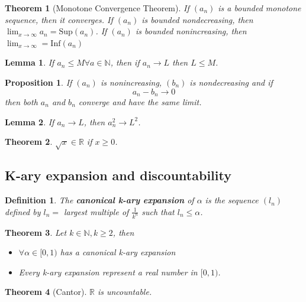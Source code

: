 \documentclass[12pt]{article}
\newtheorem{definition}{Definition}[subsection]
\newtheorem{theorem}{Theorem}[subsection]
\newtheorem{proposition}{Proposition}[subsection]
\newtheorem{lemma}{Lemma}[subsection]
\begin{document}
		\begin{theorem}[Monotone Convergence Theorem]
			If $(a_n)$ is a bounded monotone sequence, then it converges. If $(a_n)$ is bounded nondecreasing, then $\lim_{x \rightarrow \infty} a_n = \mathrm{Sup}(a_n)$. If $(a_n)$ is bounded nonincreasing, then $\lim_{x \rightarrow \infty} = \mathrm{Inf}(a_n)$
		\end{theorem}
		\begin{lemma}
			If $a_n \leq M \forall a \in \mathbb{N}$, then if $a_n \rightarrow L$ then $L \leq M$.
		\end{lemma}
		
		\begin{proposition}
			If $(a_n)$ is nonincreasing, $(b_n)$ is nondecreasing and if \[a_n - b_n \rightarrow 0\]
			then both $a_n$ and $b_n$ converge and have the same limit.
		\end{proposition}
		
		\begin{lemma}
			If $a_n \rightarrow L$, then $a_n^2 \rightarrow L^2$.
		\end{lemma}
		
		\begin{theorem}
			$\sqrt{x} \in \mathbb{R}$ if $x \geq 0$.
		\end{theorem}
		
		\subsection{K-ary expansion and discountability}
			\begin{definition}
				The \textbf{canonical k-ary expansion} of $\alpha$ is the sequence $(l_n)$ defined by $l_n = $ largest multiple of $\frac{1}{k^n}$ such that $l_n \leq \alpha$.
			\end{definition}
			
			\begin{theorem}
				Let $k \in \mathbb{N}, k\geq 2$, then
				\begin{itemize}
					\item $\forall \alpha \in [0, 1)$ has a canonical k-ary expansion
					\item Every k-ary expansion represent a real number in $[0, 1)$. 
				\end{itemize}
			\end{theorem}
			
			\begin{theorem}[Cantor]
				$\mathbb{R}$ is uncountable.
			\end{theorem}
			
\end{document}
